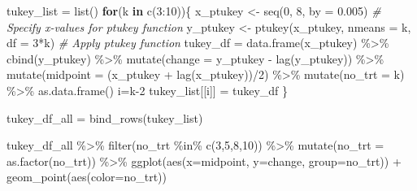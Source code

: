 \documentclass[
]{book}
\newenvironment{Shaded}{\begin{snugshade}}{\end{snugshade}}
\newcommand{\AttributeTok}[1]{\textcolor[rgb]{0.77,0.63,0.00}{#1}}
\newcommand{\CommentTok}[1]{\textcolor[rgb]{0.56,0.35,0.01}{\textit{#1}}}
\newcommand{\ControlFlowTok}[1]{\textcolor[rgb]{0.13,0.29,0.53}{\textbf{#1}}}
\newcommand{\DecValTok}[1]{\textcolor[rgb]{0.00,0.00,0.81}{#1}}
\newcommand{\FloatTok}[1]{\textcolor[rgb]{0.00,0.00,0.81}{#1}}
\newcommand{\FunctionTok}[1]{\textcolor[rgb]{0.00,0.00,0.00}{#1}}
\newcommand{\NormalTok}[1]{#1}
\newcommand{\OtherTok}[1]{\textcolor[rgb]{0.56,0.35,0.01}{#1}}
\newcommand{\SpecialCharTok}[1]{\textcolor[rgb]{0.00,0.00,0.00}{#1}}
\begin{document}
\begin{Shaded}
\begin{Highlighting}[]
\NormalTok{tukey\_list }\OtherTok{=} \FunctionTok{list}\NormalTok{()}
\ControlFlowTok{for}\NormalTok{(k }\ControlFlowTok{in} \FunctionTok{c}\NormalTok{(}\DecValTok{3}\SpecialCharTok{:}\DecValTok{10}\NormalTok{))\{}
\NormalTok{  x\_ptukey }\OtherTok{\textless{}{-}} \FunctionTok{seq}\NormalTok{(}\DecValTok{0}\NormalTok{, }\DecValTok{8}\NormalTok{, }\AttributeTok{by =} \FloatTok{0.005}\NormalTok{)                       }\CommentTok{\# Specify x{-}values for ptukey function}
\NormalTok{  y\_ptukey }\OtherTok{\textless{}{-}} \FunctionTok{ptukey}\NormalTok{(x\_ptukey, }\AttributeTok{nmeans =}\NormalTok{ k, }\AttributeTok{df =} \DecValTok{3}\SpecialCharTok{*}\NormalTok{k)     }\CommentTok{\# Apply ptukey function}
\NormalTok{  tukey\_df }\OtherTok{=} \FunctionTok{data.frame}\NormalTok{(x\_ptukey) }\SpecialCharTok{\%\textgreater{}\%}
    \FunctionTok{cbind}\NormalTok{(y\_ptukey) }\SpecialCharTok{\%\textgreater{}\%}
    \FunctionTok{mutate}\NormalTok{(}\AttributeTok{change =}\NormalTok{ y\_ptukey }\SpecialCharTok{{-}} \FunctionTok{lag}\NormalTok{(y\_ptukey)) }\SpecialCharTok{\%\textgreater{}\%}
    \FunctionTok{mutate}\NormalTok{(}\AttributeTok{midpoint =}\NormalTok{ (x\_ptukey }\SpecialCharTok{+} \FunctionTok{lag}\NormalTok{(x\_ptukey))}\SpecialCharTok{/}\DecValTok{2}\NormalTok{) }\SpecialCharTok{\%\textgreater{}\%}
    \FunctionTok{mutate}\NormalTok{(}\AttributeTok{no\_trt =}\NormalTok{ k) }\SpecialCharTok{\%\textgreater{}\%}
    \FunctionTok{as.data.frame}\NormalTok{()}
\NormalTok{  i}\OtherTok{=}\NormalTok{k}\DecValTok{{-}2}
\NormalTok{  tukey\_list[[i]] }\OtherTok{=}\NormalTok{ tukey\_df}
\NormalTok{\}}
  
\NormalTok{tukey\_df\_all }\OtherTok{=} \FunctionTok{bind\_rows}\NormalTok{(tukey\_list)}

\NormalTok{tukey\_df\_all }\SpecialCharTok{\%\textgreater{}\%}
  \FunctionTok{filter}\NormalTok{(no\_trt }\SpecialCharTok{\%in\%} \FunctionTok{c}\NormalTok{(}\DecValTok{3}\NormalTok{,}\DecValTok{5}\NormalTok{,}\DecValTok{8}\NormalTok{,}\DecValTok{10}\NormalTok{)) }\SpecialCharTok{\%\textgreater{}\%}
  \FunctionTok{mutate}\NormalTok{(}\AttributeTok{no\_trt =} \FunctionTok{as.factor}\NormalTok{(no\_trt)) }\SpecialCharTok{\%\textgreater{}\%}
  \FunctionTok{ggplot}\NormalTok{(}\FunctionTok{aes}\NormalTok{(}\AttributeTok{x=}\NormalTok{midpoint, }\AttributeTok{y=}\NormalTok{change, }\AttributeTok{group=}\NormalTok{no\_trt)) }\SpecialCharTok{+}
  \FunctionTok{geom\_point}\NormalTok{(}\FunctionTok{aes}\NormalTok{(}\AttributeTok{color=}\NormalTok{no\_trt))}
\end{Highlighting}
\end{Shaded}
\end{document}
